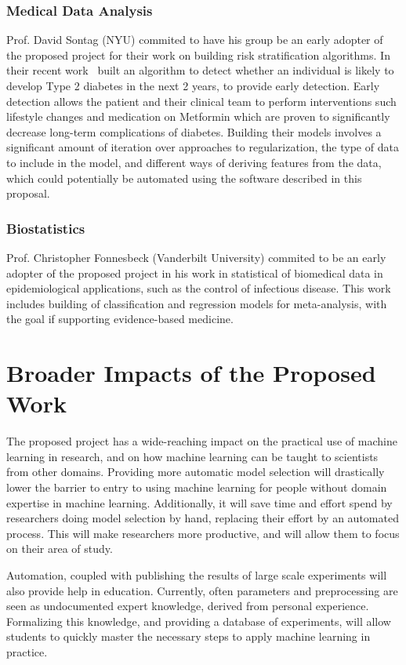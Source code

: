 \subsubsection{Medical Data Analysis}
Prof. David Sontag (NYU) commited to
have his group be an early adopter of the proposed project for their
work on building risk stratification algorithms.
In their recent work~\autocite{razavian2015population} 
built an algorithm to detect whether an individual is likely to
develop Type 2 diabetes in the next 2 years, to provide early
detection. Early detection allows the patient and their clinical team
to perform interventions such lifestyle changes and medication on
Metformin which are proven to significantly decrease long-term
complications of diabetes. Building their models involves
a significant amount of iteration over approaches to regularization,
the type of data to include in the model, and different ways of
deriving features from the data, which could potentially be automated
using the software described in this proposal.

\subsubsection{Biostatistics}
Prof. Christopher Fonnesbeck (Vanderbilt
University) commited to be an early adopter of the proposed project in
his work in statistical of biomedical data in epidemiological
applications, such as the control of infectious disease. This work
includes building of classification and regression models for
meta-analysis, with the goal if supporting evidence-based medicine.

\section{Broader Impacts of the Proposed Work}
The proposed project has a wide-reaching impact on the practical use of
machine learning in research, and on how machine learning can be taught to
 scientists from other domains.
Providing more automatic model selection will drastically lower the barrier
to entry to using machine learning for people without domain expertise
in machine learning.
Additionally, it will save time and effort spend by researchers doing
model selection by hand, replacing their effort by an automated process.
This will make researchers more productive, and will allow them to focus
on their area of study.

Automation, coupled with publishing the results of large scale experiments will
also provide help in education. Currently, often parameters and preprocessing
are seen as undocumented expert knowledge, derived from personal experience.
Formalizing this knowledge, and providing a database of experiments, will allow
students to quickly master the necessary steps to apply machine learning in
practice.

